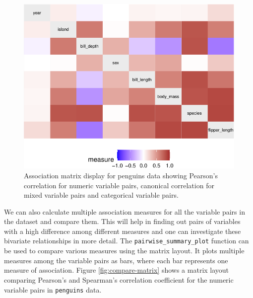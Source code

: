 \begin{Schunk}
\begin{figure}

{\centering \includegraphics{rj_paper_files/figure-latex/assoc-heatmap-1} 

}

\caption[Association matrix display for penguins data showing Pearson's correlation for numeric variable pairs, canonical correlation for mixed variable pairs and categorical variable pairs]{Association matrix display for penguins data showing Pearson's correlation for numeric variable pairs, canonical correlation for mixed variable pairs and categorical variable pairs.}\label{fig:assoc-heatmap}
\end{figure}
\end{Schunk}

We can also calculate multiple association measures for all the variable
pairs in the dataset and compare them. This will help in finding out
pairs of variables with a high difference among different measures and
one can investigate these bivariate relationships in more detail. The
\texttt{pairwise\_summary\_plot} function can be used to compare various
measures using the matrix layout. It plots multiple measures among the
variable pairs as bars, where each bar represents one measure of
association. Figure \ref{fig:compare-matrix} shows a matrix layout
comparing Pearson's and Spearman's correlation coefficient for the
numeric variable pairs in \texttt{penguins} data.

